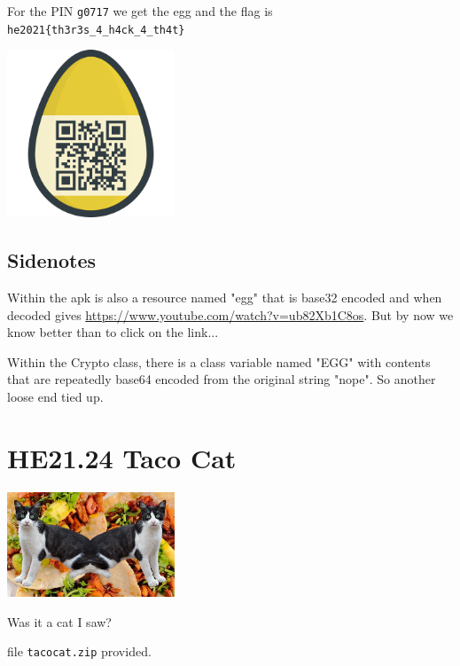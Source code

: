 \documentclass[english,a4paper,nols,noindent]{tufte-handout}
\begin{document}
\noindent For the PIN \verb+g0717+ we get the egg and the 
flag is \verb+he2021{th3r3s_4_h4ck_4_th4t}+
\begin{marginfigure}
    \includegraphics[width=50mm]{ch23/solution23.png}
\end{marginfigure}

\subsection{Sidenotes}

Within the apk is also a resource named "egg" that is
base32 encoded and when decoded gives
\url{https://www.youtube.com/watch?v=ub82Xb1C8os}.  But by now we know better
than to click on the link...

Within the Crypto class, there is a class variable named "EGG" with contents
that are repeatedly base64 encoded from the original string "nope".  So another
loose end tied up.

\hypertarget{he21.24}{%
  \section{HE21.24 Taco Cat}
  \label{he21.24}}
\begin{marginfigure}
    \includegraphics[width=50mm]{images/challenge24.jpg}
\end{marginfigure}

\noindent Was it a cat I saw?

\noindent file \verb+tacocat.zip+ provided.
\end{document}
